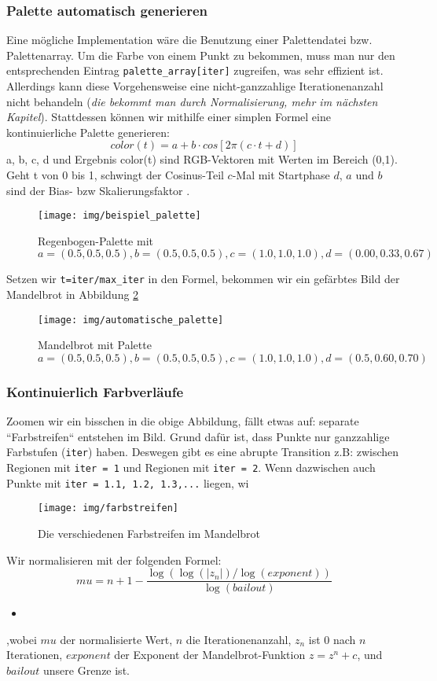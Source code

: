 \documentclass{article}
\begin{document}
\subsubsection{Palette automatisch generieren}
Eine mögliche Implementation wäre die Benutzung einer Palettendatei bzw. Palettenarray. Um die Farbe von einem Punkt zu bekommen, muss man nur den entsprechenden Eintrag \lstinline|palette_array[iter]| zugreifen, was sehr effizient ist. Allerdings kann diese Vorgehensweise eine nicht-ganzzahlige Iterationenanzahl nicht behandeln (\textit{die bekommt man durch Normalisierung, mehr im nächsten Kapitel}). Stattdessen können wir mithilfe einer simplen Formel eine kontinuierliche Palette generieren:
$$color(t) = a + b \cdot cos[ 2\pi(c \cdot t+d)] $$
a, b, c, d und Ergebnis color(t) sind RGB-Vektoren mit Werten im Bereich (0,1). Geht t von 0 bis 1, schwingt der Cosinus-Teil $c$-Mal mit Startphase $d$, $a$ und $b$ sind der Bias- bzw Skalierungsfaktor \cite{quilez}. 

\begin{figure}[!htb]
\centering
\texttt{[image: img/beispiel\_palette]}
\caption{Regenbogen-Palette mit $a=(0.5,0.5,0.5), b=(0.5, 0.5, 0.5), c=(1.0, 1.0, 1.0), d=(0.00, 0.33, 0.67)$}
\label{fig:beispielpalette}
\end{figure}

Setzen wir \lstinline|t=iter/max_iter| in den Formel, bekommen wir ein gefärbtes Bild der Mandelbrot in Abbildung \ref{fig:mandelbrot_palette}

\begin{figure}[!h]
\centering
\texttt{[image: img/automatische\_palette]}
\caption{Mandelbrot mit Palette $a=(0.5,0.5,0.5), b=(0.5,0.5,0.5),c=(1.0,1.0,1.0),d=(0.5,0.60,0.70)$}
\label{fig:mandelbrot_palette}
\end{figure}

\subsubsection{Kontinuierlich Farbverläufe}
Zoomen wir ein bisschen in die obige Abbildung, fällt etwas auf: separate ``Farbstreifen`` entstehen im Bild. Grund dafür ist, dass Punkte nur ganzzahlige Farbstufen (\lstinline|iter|) haben. Deswegen gibt es eine abrupte Transition z.B: zwischen Regionen mit \lstinline|iter = 1| und Regionen mit \lstinline|iter = 2|. Wenn dazwischen auch Punkte mit \lstinline|iter = 1.1, 1.2, 1.3,...| liegen, wi

\begin{figure}
\centering
\texttt{[image: img/farbstreifen]}
\caption{Die verschiedenen Farbstreifen im Mandelbrot}
\label{fig:farbstreifen}
\end{figure}
Wir normalisieren mit der folgenden Formel:
$$mu = n + 1 - \frac{\log(\log(|z_n|) / \log(exponent))}{\log(bailout)} $$
\begin{itemize}
\item 
\end{itemize}
,wobei $mu$ der normalisierte Wert, $n$ die Iterationenanzahl, $z_n$ ist 0 nach $n$ Iterationen, $exponent$ der Exponent der Mandelbrot-Funktion $z = z^n + c$, und $bailout$ unsere Grenze ist. 
\end{document}
